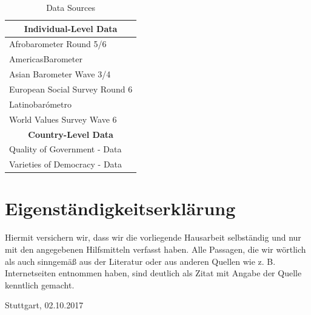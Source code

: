 \documentclass{systats}
\begin{document}
\begin{table}[!h]
	\centering
	\caption{Data Sources}
	\label{wuff}
	\begin{tabular}{@{}l@{}}
		\toprule
		\multicolumn{1}{c}{\textbf{Individual-Level Data}} \\ \midrule
		Afrobarometer Round 5/6  \citeyearpar{afro} \\
		AmericasBarometer \citeyearpar{americas} \\
		Asian Barometer Wave 3/4 \citeyearpar{asian} \\
		European Social Survey Round 6 \citeyearpar{european} \\
		Latinobarómetro \citeyearpar{latino} \\
		World Values Survey Wave 6 \citeyearpar{world} \\ \midrule
		\multicolumn{1}{c}{\textbf{Country-Level Data}} \\ \midrule
		Quality of Government - Data \citep{teorell2017qog} \\
		Varieties of Democracy - Data \citep{coppedge2017vdata}
	\end{tabular}
\end{table}


\clearpage
\section*{Eigenständigkeitserklärung}
\vspace*{2cm}
\begin{center}
	\begin{minipage}[t]{0.8\textwidth}
		Hiermit versichern wir, dass wir die vorliegende Hausarbeit selbständig und nur mit den angegebenen Hilfsmitteln verfasst haben. Alle Passagen, die wir wörtlich als auch sinngemäß aus der Literatur oder aus anderen Quellen wie z. B. Internetseiten entnommen haben, sind deutlich als Zitat mit Angabe der Quelle kenntlich gemacht.
		
		\vspace*{60mm}
		Stuttgart, 02.10.2017
	\end{minipage}
\end{center}
\end{document}

